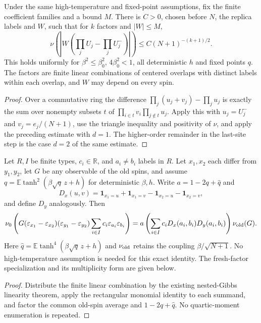 \begin{lemma}
\label{lem:sg-tal:product-truncation-comparison}
\leanok
{}
Under the same high-temperature and fixed-point assumptions, fix the finite coefficient
families and a bound $M$. There is $C>0$, chosen before $N$, the replica labels and $W$,
such that for $k$ factors and $|W|\le M$,
\[
 \nu\left(\left|W\left(\prod_j U_j-\prod_j U_j^-\right)\right|\right)
 \le C (N+1)^{-(k+1)/2}.
\]
This holds uniformly for $\beta^2\le\beta_0^2$, $4\beta_0^2<1$, all deterministic
$h$ and fixed points $q$. The factors are finite linear combinations of centered
overlaps with distinct labels within each overlap, and $W$ may depend on every spin.
\end{lemma}
\begin{proof}
\leanok
Over a commutative ring the difference $\prod_j(u_j+v_j)-\prod_j u_j$ is exactly the
sum over nonempty subsets $t$ of $\prod_{i\in t}v_i\prod_{j\notin t}u_j$.
Apply this with $u_j=U_j^-$ and $v_j=e_j/(N+1)$, use the triangle inequality and
positivity of $\nu$, and apply the preceding estimate with $d=1$. The higher-order
remainder in the last-site step is the case $d=2$ of the same estimate.
\end{proof}

\begin{lemma}
\label{lem:sg-tal:rectangular-linear-contraction}
\leanok
{}
Let $R,I$ be finite types, $c_i\in\mathbb R$, and $a_i\ne b_i$ labels in $R$.
Let $x_1,x_2$ each differ from $y_1,y_2$, let $G$ be any observable of the old spins,
and assume $q=\mathbb E\tanh^2(\beta\sqrt q\,z+h)$ for deterministic $\beta,h$.
Write $a=1-2q+\widehat q$ and
\[
 D_x(u,v)=\mathbf1_{x_1=u}+\mathbf1_{x_1=v}
             -\mathbf1_{x_2=u}-\mathbf1_{x_2=v},
\]
and define $D_y$ analogously. Then
\[
 \nu_0\left(G(\varepsilon_{x_1}-\varepsilon_{x_2})
                 (\varepsilon_{y_1}-\varepsilon_{y_2})
                 \sum_{i\in I}c_i\varepsilon_{a_i}\varepsilon_{b_i}\right)
 = a\left(\sum_{i\in I}c_i D_x(a_i,b_i)D_y(a_i,b_i)\right)\nu_{\rm old}(G).
\]
Here $\widehat q=\mathbb E\tanh^4(\beta\sqrt q\,z+h)$ and $\nu_{\rm old}$ retains
the coupling $\beta/\sqrt{N+1}$. No high-temperature assumption is needed for this
exact identity. The fresh-factor specialization and its multiplicity form are given below.
\end{lemma}
\begin{proof}
\leanok
Distribute the finite linear combination by the existing nested-Gibbs linearity theorem,
apply the rectangular monomial identity to each summand, and factor the common old-spin
average and $1-2q+\widehat q$. No quartic-moment enumeration is repeated.
\end{proof}

